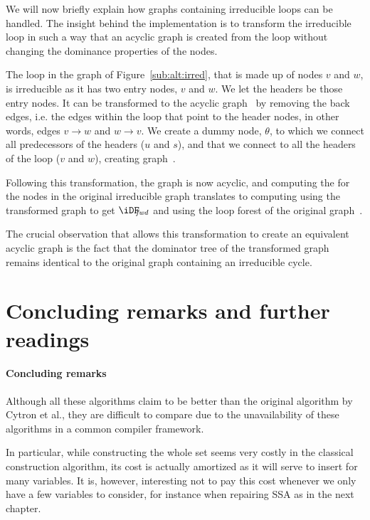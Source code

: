 {We will now briefly explain how graphs containing irreducible loops can be handled. 
The insight behind the implementation is to transform the irreducible loop in such a way that an acyclic graph is created from the loop without changing the dominance properties of the nodes.

The loop in the graph of Figure~\ref{sub:alt:irred}, that is made up of nodes $v$ and $w$, is irreducible as it has two entry nodes, $v$ and $w$. 
We let the headers be those entry nodes. 
It can be transformed to the acyclic graph~ by removing the back edges, i.e.  the edges within the loop that point to the header nodes, in other words, edges $v\rightarrow w$ and $w\rightarrow v$. 
We create a dummy node, $\theta$, to which we connect all predecessors of the headers ($u$ and $s$), and that we connect to all the headers of the loop ($v$ and $w$), creating graph~.

Following this transformation, the graph is now acyclic, and computing the \iDF for the nodes in the original irreducible graph translates to computing \iDF using the transformed graph to get $\iDFfwd$ and using the loop forest of the original graph~.

The crucial observation that allows this transformation to create an equivalent acyclic graph is the fact that the dominator tree of the transformed graph remains identical to the original graph containing an irreducible cycle.

\section{Concluding remarks and further readings}
\paragraph{Concluding remarks}
Although all these algorithms claim to be better than the original algorithm by Cytron et al., they are difficult to compare due to the unavailability of these algorithms in a common compiler framework.

In particular, while constructing the whole \iDF set seems very costly in the classical construction algorithm, its cost is actually amortized as it will serve to insert \phifuns for many variables. 
It is, however, interesting not to pay this cost whenever we only have a few variables to consider, for instance when repairing SSA as in the next chapter.

}
